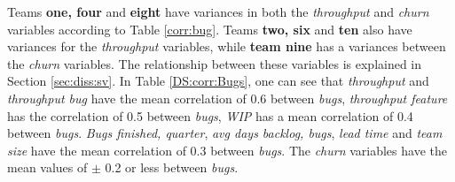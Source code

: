\documentclass[UKenglish]{ifimaster}  %
\begin{document}
Teams \textbf{one, four} and \textbf{eight} have variances in both the \textit{throughput} and \textit{churn} variables according to Table \ref{corr:bug}. Teams \textbf{two, six} and \textbf{ten} also have variances for the \textit{throughput} variables, while \textbf{team nine} has a variances between the \textit{churn} variables. The relationship between these variables is explained in  Section \ref{sec:diss:sv}.
In Table \ref{DS:corr:Bugs}, one can see that \textit{throughput} and \textit{throughput bug} have the mean correlation of 0.6 between \textit{bugs}, \textit{throughput feature} has the correlation of 0.5 between \textit{bugs}, \textit{WIP} has a mean correlation of 0.4 between \textit{bugs}.  \textit{Bugs finished, quarter}, \textit{avg days backlog, bugs}, \textit{lead time} and \textit{team size} have the mean correlation of 0.3 between \textit{bugs}. The \textit{churn} variables have the  mean values of $\pm$ 0.2 or less between \textit{bugs}.
\end{document}
